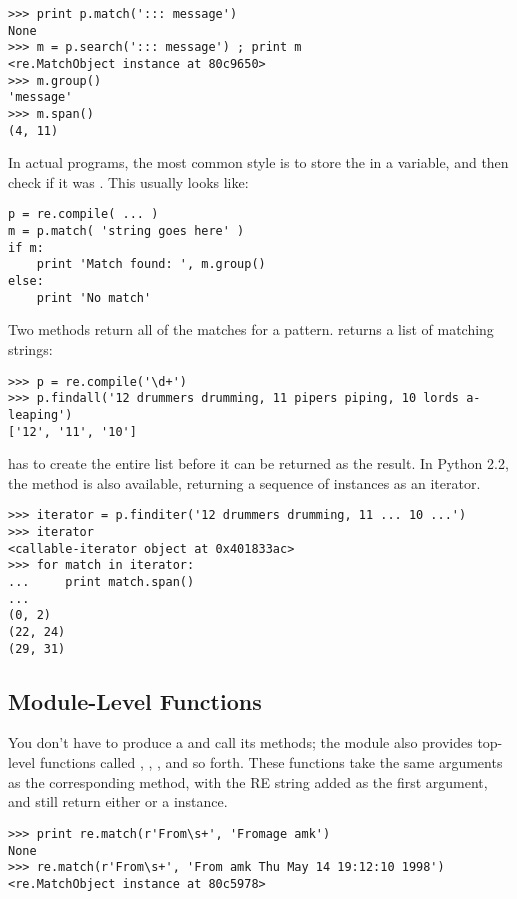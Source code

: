 \documentclass{howto}
\begin{document}
\begin{verbatim}
>>> print p.match('::: message')
None
>>> m = p.search('::: message') ; print m
<re.MatchObject instance at 80c9650>
>>> m.group()
'message'
>>> m.span()
(4, 11)
\end{verbatim}

In actual programs, the most common style is to store the
 in a variable, and then check if it was
.  This usually looks like:

\begin{verbatim}
p = re.compile( ... )
m = p.match( 'string goes here' )
if m:
    print 'Match found: ', m.group()
else:
    print 'No match'
\end{verbatim}

Two  methods return all of the matches for a pattern.
 returns a list of matching strings:

\begin{verbatim}
>>> p = re.compile('\d+')
>>> p.findall('12 drummers drumming, 11 pipers piping, 10 lords a-leaping')
['12', '11', '10']
\end{verbatim}

 has to create the entire list before it can be
returned as the result.  In Python 2.2, the  method
is also available, returning a sequence of  instances 
as an iterator.

\begin{verbatim}
>>> iterator = p.finditer('12 drummers drumming, 11 ... 10 ...')
>>> iterator
<callable-iterator object at 0x401833ac>
>>> for match in iterator:
...     print match.span()
...
(0, 2)
(22, 24)
(29, 31)
\end{verbatim}


\subsection{Module-Level Functions}

You don't have to produce a  and call its methods;
the  module also provides top-level functions called
, , , and so
forth.  These functions take the same arguments as the corresponding
 method, with the RE string added as the first
argument, and still return either  or a 
instance.

\begin{verbatim}
>>> print re.match(r'From\s+', 'Fromage amk')
None
>>> re.match(r'From\s+', 'From amk Thu May 14 19:12:10 1998')
<re.MatchObject instance at 80c5978>
\end{verbatim}
\end{document}
